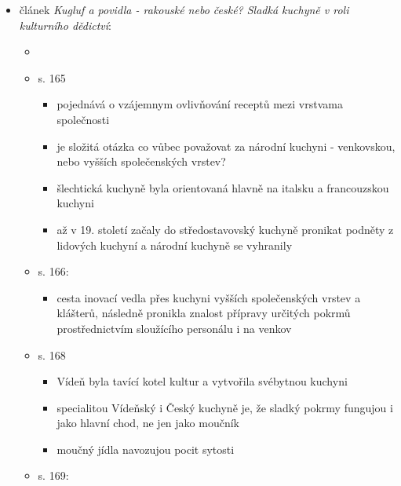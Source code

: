 \begin{itemize}
  \begin{itemize}
  \tightlist
  \item
    článek \emph{Kugluf a povidla - rakouské nebo české? Sladká kuchyně
    v roli kulturního dědictví}:

    \begin{itemize}
    \tightlist
    \item
    \item
      s. 165

      \begin{itemize}
      \tightlist
      \item
        pojednává o vzájemnym ovlivňování receptů mezi vrstvama
        společnosti
      \item
        je složitá otázka co vůbec považovat za národní kuchyni -
        venkovskou, nebo vyšších společenských vrstev?
      \item
        šlechtická kuchyně byla orientovaná hlavně na italsku a
        francouzskou kuchyni
      \item
        až v 19. století začaly do středostavovský kuchyně pronikat
        podněty z lidových kuchyní a národní kuchyně se vyhranily
      \end{itemize}
    \item
      s. 166:

      \begin{itemize}
      \tightlist
      \item
        cesta inovací vedla přes kuchyni vyšších společenských vrstev a
        klášterů, následně pronikla znalost přípravy určitých pokrmů
        prostřednictvím sloužícího personálu i na venkov
      \end{itemize}
    \item
      s. 168

      \begin{itemize}
      \tightlist
      \item
        Vídeň byla tavící kotel kultur a vytvořila svébytnou kuchyni
      \item
        specialitou Vídeňský i Český kuchyně je, že sladký pokrmy
        fungujou i jako hlavní chod, ne jen jako moučník
      \item
        moučný jídla navozujou pocit sytosti
      \end{itemize}
    \item
      s. 169:


\end{itemize}
\end{itemize}
\end{itemize}
